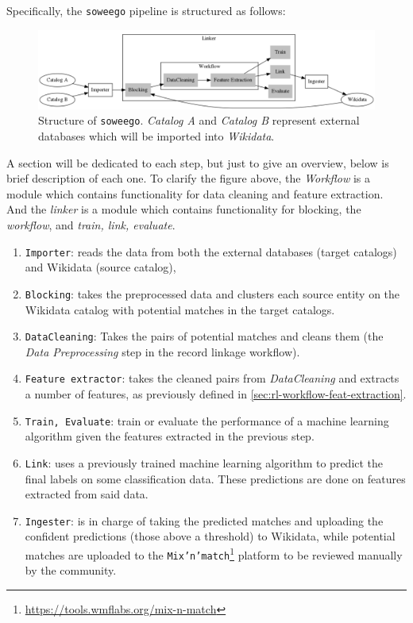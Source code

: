 \documentclass[epsfig,a4paper,11pt,titlepage,twoside,openany]{book}
\newcommand{\footurl}[1]{\footnote{\url{#1}}}
\begin{document}
Specifically, the \texttt{soweego} pipeline is structured as follows:

\begin{figure}[H]
  \centering \includegraphics[width=\textwidth]{soweego_structure}
  \caption{Structure of \texttt{soweego}. \textit{Catalog A} and \textit{Catalog
      B} represent external databases which will be imported into
    \textit{Wikidata}.}
  \label{fig:soweego-structure}
\end{figure}

A section will be dedicated to each step, but just to give an overview, below is brief description of each one. To clarify the figure above, the \textit{Workflow} is a module which contains functionality for data cleaning and feature extraction. And the \textit{linker} is a module which contains functionality for blocking, the \textit{workflow}, and \textit{train, link, evaluate}.

\begin{enumerate}
\item \texttt{Importer}: 
reads the data from both the external databases (target catalogs) and Wikidata (source catalog),

\item \texttt{Blocking}: 
takes the preprocessed data and clusters each source entity on the Wikidata catalog with potential matches in the target catalogs.

\item \texttt{DataCleaning}: 
Takes the pairs of potential matches and cleans them (the \textit{Data Preprocessing} step in the record linkage workflow).
  
\item \texttt{Feature extractor}: 
takes the cleaned pairs from \textit{DataCleaning} and extracts a number of features, as previously defined in \autoref{sec:rl-workflow-feat-extraction}.
 
\item \texttt{Train, Evaluate}:
train or evaluate the performance of a machine learning algorithm given the features extracted in the previous step.

\item \texttt{Link}:
uses a previously trained machine learning algorithm to predict the final labels on some classification data. These predictions are done on features extracted from said data.
 
\item \texttt{Ingester}: 
is in charge of taking the predicted matches and uploading the confident predictions (those above a threshold) to Wikidata, while potential matches are uploaded to the \texttt{Mix'n'match}\footurl{https://tools.wmflabs.org/mix-n-match} platform to be reviewed manually by the community.
\end{enumerate}
\end{document}
